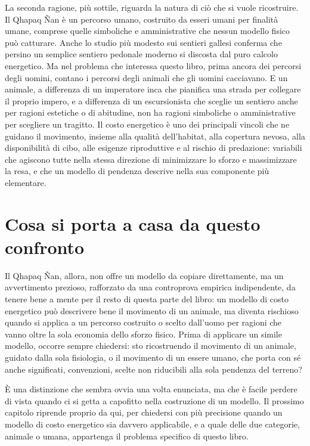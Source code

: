 La seconda ragione, più sottile, riguarda la natura di ciò che si vuole ricostruire. Il Qhapaq Ñan è un percorso umano, costruito da esseri umani per finalità umane, comprese quelle simboliche e amministrative che nessun modello fisico può catturare. Anche lo studio più modesto sui sentieri gallesi conferma che persino un semplice sentiero pedonale moderno si discosta dal puro calcolo energetico. Ma nel problema che interessa questo libro, prima ancora dei percorsi degli uomini, contano i percorsi degli animali che gli uomini cacciavano. E un animale, a differenza di un imperatore inca che pianifica una strada per collegare il proprio impero, e a differenza di un escursionista che sceglie un sentiero anche per ragioni estetiche o di abitudine, non ha ragioni simboliche o amministrative per scegliere un tragitto. Il costo energetico è uno dei principali vincoli che ne guidano il movimento, insieme alla qualità dell'habitat, alla copertura nevosa, alla disponibilità di cibo, alle esigenze riproduttive e al rischio di predazione: variabili che agiscono tutte nella stessa direzione di minimizzare lo sforzo e massimizzare la resa, e che un modello di pendenza descrive nella sua componente più elementare.

\section{Cosa si porta a casa da questo confronto}

Il Qhapaq Ñan, allora, non offre un modello da copiare direttamente, ma un avvertimento prezioso, rafforzato da una controprova empirica indipendente, da tenere bene a mente per il resto di questa parte del libro: un modello di costo energetico può descrivere bene il movimento di un animale, ma diventa rischioso quando si applica a un percorso costruito o scelto dall'uomo per ragioni che vanno oltre la sola economia dello sforzo fisico. Prima di applicare un simile modello, occorre sempre chiedersi: sto ricostruendo il movimento di un animale, guidato dalla sola fisiologia, o il movimento di un essere umano, che porta con sé anche significati, convenzioni, scelte non riducibili alla sola pendenza del terreno?

È una distinzione che sembra ovvia una volta enunciata, ma che è facile perdere di vista quando ci si getta a capofitto nella costruzione di un modello. Il prossimo capitolo riprende proprio da qui, per chiedersi con più precisione quando un modello di costo energetico sia davvero applicabile, e a quale delle due categorie, animale o umana, appartenga il problema specifico di questo libro.
